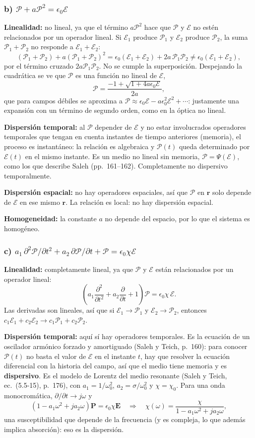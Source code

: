 \documentclass{article}
\newcommand{\Ec}{\boldsymbol{\mathcal{E}}}
\newcommand{\Pc}{\boldsymbol{\mathcal{P}}}
\newcommand{\Pe}{\mathcal{P}}
\newcommand{\Ee}{\mathcal{E}}
\begin{document}
\subsubsection*{b) $\Pc+a\Pc^2=\epsilon_0\Ec$}

\textbf{Linealidad:} no lineal, ya que el término $a\Pc^2$ hace que $\Pc$ y $\Ec$ no estén relacionados
por un operador lineal. Si $\Ec_1$ produce $\Pc_1$ y $\Ec_2$ produce $\Pc_2$, la suma $\Pc_1+\Pc_2$ no
responde a $\Ec_1+\Ec_2$:
\[
(\Pc_1+\Pc_2)+a(\Pc_1+\Pc_2)^2=\epsilon_0(\Ec_1+\Ec_2)+2a\,\Pc_1\Pc_2\neq\epsilon_0(\Ec_1+\Ec_2),
\]
por el término cruzado $2a\Pc_1\Pc_2$. No se cumple la superposición. Despejando la cuadrática se ve
que $\Pe$ es una función no lineal de $\Ee$,
\[
\Pe=\frac{-1+\sqrt{1+4a\epsilon_0\Ee}}{2a},
\]
que para campos débiles se aproxima a $\Pe\approx\epsilon_0\Ee-a\epsilon_0^2\Ee^2+\cdots$: justamente una
expansión con un término de segundo orden, como en la óptica no lineal.

\textbf{Dispersión temporal:} al $\Pc$ depender de $\Ec$ y no estar involucrados operadores temporales
que tengan en cuenta instantes de tiempo anteriores (memoria), el proceso es instantáneo: la relación
es algebraica y $\Pc(t)$ queda determinado por $\Ec(t)$ en el mismo instante. Es un medio no lineal
sin memoria, $\Pc=\Psi(\Ec)$, como los que describe Saleh (pp.~161--162). Completamente no
dispersivo temporalmente.

\textbf{Dispersión espacial:} no hay operadores espaciales, así que $\Pc$ en $\mathbf r$ solo depende de
$\Ec$ en ese mismo $\mathbf r$. La relación es local: no hay dispersión espacial.

\textbf{Homogeneidad:} la constante $a$ no depende del espacio, por lo que el sistema es homogéneo.

\subsubsection*{c) $a_1\,\partial^2\Pc/\partial t^2+a_2\,\partial\Pc/\partial t+\Pc=\epsilon_0\chi\Ec$}

\textbf{Linealidad:} completamente lineal, ya que $\Pc$ y $\Ec$ están relacionados por un operador
lineal:
\[
\left(a_1\frac{\partial^2}{\partial t^2}+a_2\frac{\partial}{\partial t}+1\right)\Pc=\epsilon_0\chi\,\Ec .
\]
Las derivadas son lineales, así que si $\Ec_1\to\Pc_1$ y $\Ec_2\to\Pc_2$, entonces
$c_1\Ec_1+c_2\Ec_2\to c_1\Pc_1+c_2\Pc_2$.

\textbf{Dispersión temporal:} aquí sí hay operadores temporales. Es la ecuación de un oscilador
armónico forzado y amortiguado (Saleh y Teich, p.~160): para conocer $\Pc(t)$ no basta el valor de $\Ec$
en el instante $t$, hay que resolver la ecuación diferencial con la historia del campo, así que el
medio tiene memoria y es \textbf{dispersivo}. Es el modelo de Lorentz del medio resonante
(Saleh y Teich, ec.~(5.5-15), p.~176), con $a_1=1/\omega_0^2$, $a_2=\sigma/\omega_0^2$ y $\chi=\chi_0$.
Para una onda monocromática, $\partial/\partial t\to j\omega$ y
\[
\left(1-a_1\omega^2+ja_2\omega\right)\mathbf P=\epsilon_0\chi\mathbf E
\quad\Rightarrow\quad
\chi(\omega)=\frac{\chi}{1-a_1\omega^2+ja_2\omega},
\]
una susceptibilidad que depende de la frecuencia (y es compleja, lo que además implica absorción):
eso es la dispersión.
\end{document}
